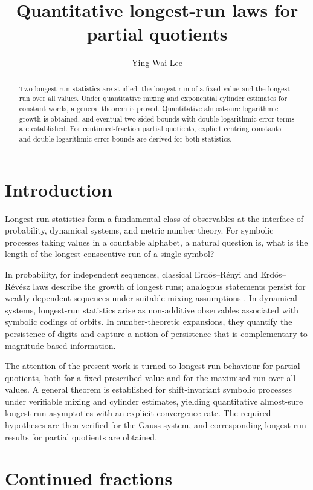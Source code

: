 \documentclass[12pt,reqno]{amsart}
\title{Quantitative longest-run laws for partial quotients}
\author{Ying Wai Lee}
\theoremstyle{definition}
\theoremstyle{plain}
\begin{document}
\begin{abstract}
    Two longest-run statistics are studied: the longest run of a fixed value and the longest run over all values. Under quantitative mixing and exponential cylinder estimates for constant words, a general theorem is proved. Quantitative almost-sure logarithmic growth is obtained, and eventual two-sided bounds with double-logarithmic error terms are established. For continued-fraction partial quotients, explicit centring constants and double-logarithmic error bounds are derived for both statistics.
\end{abstract}

\maketitle

\section{Introduction}\label{sec:introduction}

Longest-run statistics form a fundamental class of observables at the interface of probability, dynamical systems, and metric number theory. For symbolic processes taking values in a countable alphabet, a natural question is, what is the length of the longest consecutive run of a single symbol?

In probability, for independent sequences, classical Erd\H{o}s--R\'enyi and Erd\H{o}s--R\'ev\'esz laws describe the growth of longest runs; analogous statements persist for weakly dependent sequences under suitable mixing assumptions \cite{grill1987erdHos}. In dynamical systems, longest-run statistics arise as non-additive observables associated with symbolic codings of orbits. In number-theoretic expansions, they quantify the persistence of digits and capture a notion of persistence that is complementary to magnitude-based information.

The attention of the present work is turned to longest-run behaviour for partial quotients, both for a fixed prescribed value and for the maximised run over all values. A general theorem is established for shift-invariant symbolic processes under verifiable mixing and cylinder estimates, yielding quantitative almost-sure longest-run asymptotics with an explicit convergence rate. The required hypotheses are then verified for the Gauss system, and corresponding longest-run results for partial quotients are obtained.

\section{Continued fractions}
\end{document}
